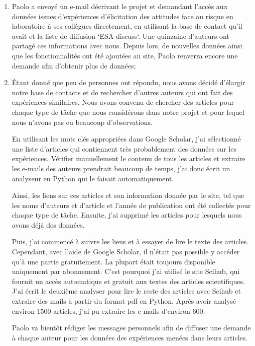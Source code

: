 \documentclass[12pt]{article}
\begin{document}
\begin{enumerate}
\item Paolo a envoyé un e-mail décrivant le projet et demandant l'accès aux données issues d'expériences d'élicitation des attitudes face au risque en laboratoire à ses collègues directement, en utilisant la base de contact qu'il avait et la liste de diffusion `ESA-discuss`. Une quinzaine d'auteurs ont partagé ces informations avec nous. Depuis lors, de nouvelles données ainsi que les fonctionnalités ont été ajoutées au site, Paolo renverra encore une demande afin d'obtenir plus de données; 
\item Étant donné que peu de personnes ont répondu, nous avons décidé d'élargir notre base de contacts et de rechercher d'autres auteurs qui ont fait des expériences similaires. Nous avons convenu de chercher des articles pour chaque type de tâche que nous considérons dans notre projet et pour lequel nous n'avons pas eu beaucoup d'observations.

En utilisant les mots clés appropriées dans Google Scholar, j'ai sélectionné une liste d'articles qui contiennent très probablement des données sur les expériences. Vérifier manuellement le contenu de tous les articles et extraire les e-mails des auteurs prendrait beaucoup de temps, j'ai donc écrit un analyseur en Python qui le faisait automatiquement.

Ainsi, les liens sur ces articles et son information donnée par le site, tel que les noms d'auteurs et d'article et l'année de publication ont été collectés pour chaque type de tâche. Ensuite, j'ai supprimé les articles pour lesquels nous avons déjà des données.

Puis, j'ai commencé à suivre les liens et à essayer de lire le texte des articles. Cependant, avec l'aide de Google Scholar, il n’était pas possible y accéder qu'à une partie gratuitement. La plupart était toujours disponible uniquement par abonnement. C’est pourquoi j'ai utilisé le site Scihub, qui fournit un accès automatique et gratuit aux textes des articles scientifiques. J'ai écrit le deuxième analyser pour lire le reste des articles avec Scihub et extraire des mails à partir du format pdf en Python. Après avoir analysé environ 1500 articles, j'ai pu extraire les e-mails d'environ 600. 

Paolo va bientôt rédiger les messages personnels afin de diffuser une demande à chaque auteur pour les données des expériences menées dans leurs articles.

\end{enumerate}
\end{document}
